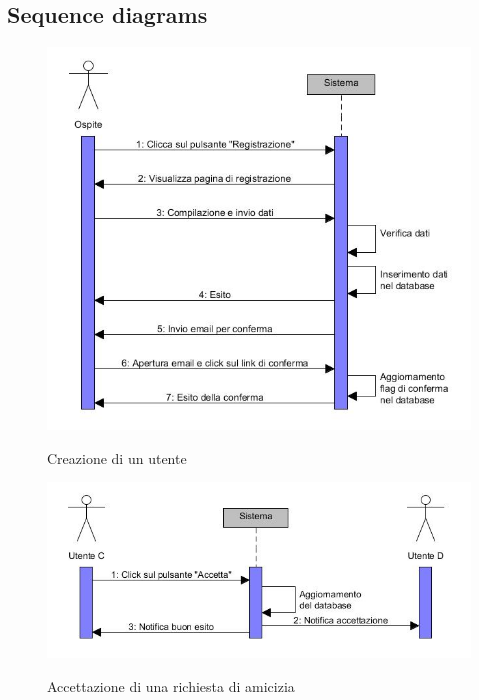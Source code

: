 \documentclass[a4paper,12pt]{article}
\begin{document}
\subsection{Sequence diagrams}
\begin{figure}
\centering
\includegraphics[scale=0.70]{sDiagrams/creazioneUtente.jpg}
\caption{\label{creazioneUtente} Creazione di un utente}
\vspace{1cm}
\includegraphics[scale=0.70]{sDiagrams/accettazioneAmicizia.jpg} \\
\caption{\label{accettazioneAmicizia} Accettazione di una richiesta di amicizia}
\end{figure}
\clearpage
\end{document}
